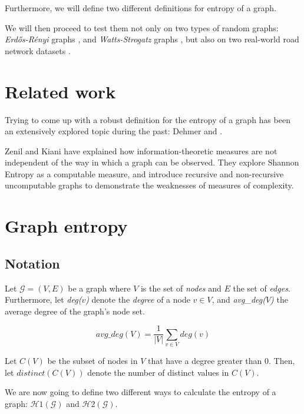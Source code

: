\documentclass[journal]{IEEEtran}
\begin{document}
Furthermore, we will define two different definitions for entropy of a graph.

We will then proceed to test them not only on two types of random graphs: \textit{Erdős-Rényi} graphs \cite{erdosRenyiGraphs}, and \textit{Watts-Strogatz} graphs \cite{watts1998collective}, but also on two real-world road network datasets \cite{snapnets}.


\section{Related work}

Trying to come up with a robust definition for the entropy of a graph has been an extensively explored topic during the past: Dehmer \cite{dehmer2008} and \cite{dehmer2011}.

Zenil and Kiani \cite{zenil2016low} have explained how information-theoretic measures are not independent of the way in which a graph can be observed. They explore Shannon Entropy as a computable measure, and introduce recursive and non-recursive uncomputable graphs to demonstrate the weaknesses of measures of complexity.


\section{Graph entropy}

\subsection{Notation}

Let $ \mathcal{G} = (V, E) $ be a graph where $V$ is the set of \textit{nodes} and $E$ the set of \textit{edges}. Furthermore, let \textit{deg($v$)} denote the \textit{degree} of a node $v \in V$, and \textit{avg\_deg($V$)} the average degree of the graph's node set.

\begin{equation}
   avg\_deg(V) =  \frac{1}{|V|} \sum_{v \in V} deg(v)
\end{equation}

Let $C(V)$ be the subset of nodes in $V$ that have a degree greater than 0. Then, let $ distinct(C(V)) $ denote the number of distinct values in $C(V)$.

We are now going to define two different ways to calculate the entropy of a graph: $\mathcal{H}1(\mathcal{G})$ and $\mathcal{H}2(\mathcal{G})$.
\end{document}
